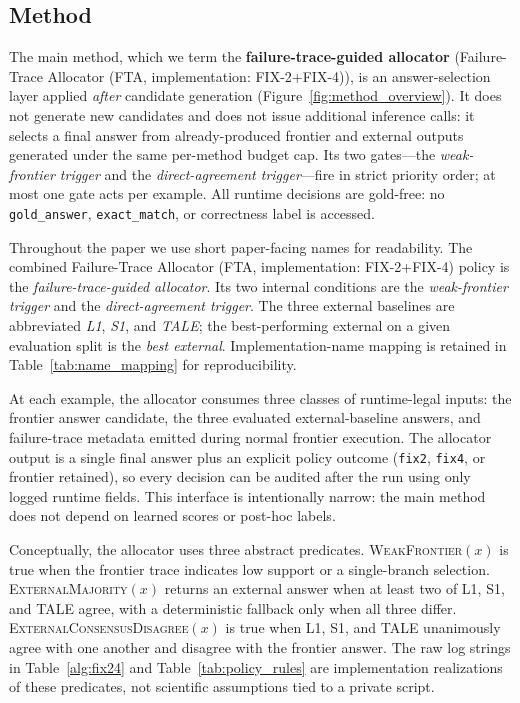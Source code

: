 \subsection{Method}
\label{sec:method}

The main method, which we term the \textbf{failure-trace-guided allocator} (Failure-Trace Allocator (FTA, implementation: FIX-2+FIX-4)), is an answer-selection layer applied \emph{after} candidate generation (Figure~\ref{fig:method_overview}). It does not generate new candidates and does not issue additional inference calls: it selects a final answer from already-produced frontier and external outputs generated under the same per-method budget cap. Its two gates---the \textit{weak-frontier trigger} and the \textit{direct-agreement trigger}---fire in strict priority order; at most one gate acts per example. All runtime decisions are gold-free: no \texttt{gold\_answer}, \texttt{exact\_match}, or correctness label is accessed.

Throughout the paper we use short paper-facing names for readability.
The combined Failure-Trace Allocator (FTA, implementation: FIX-2+FIX-4) policy is the \emph{failure-trace-guided allocator}.
Its two internal conditions are the \emph{weak-frontier trigger} and the \emph{direct-agreement trigger}.
The three external baselines are abbreviated \emph{L1}, \emph{S1}, and \emph{TALE}; the best-performing external on a given evaluation split is the \emph{best external}.
Implementation-name mapping is retained in Table~\ref{tab:name_mapping} for reproducibility.

At each example, the allocator consumes three classes of runtime-legal inputs:
the frontier answer candidate, the three evaluated external-baseline answers, and
failure-trace metadata emitted during normal frontier execution.
The allocator output is a single final answer plus an explicit policy outcome
(\texttt{fix2}, \texttt{fix4}, or frontier retained), so every decision can be
audited after the run using only logged runtime fields.
This interface is intentionally narrow: the main method does not depend on
learned scores or post-hoc labels.

Conceptually, the allocator uses three abstract predicates.
\textsc{WeakFrontier}$(x)$ is true when the frontier trace indicates low support
or a single-branch selection.
\textsc{ExternalMajority}$(x)$ returns an external answer when at least two of
L1, S1, and TALE agree, with a deterministic fallback only when all three differ.
\textsc{ExternalConsensusDisagree}$(x)$ is true when L1, S1, and TALE unanimously
agree with one another and disagree with the frontier answer.
The raw log strings in Table~\ref{alg:fix24} and Table~\ref{tab:policy_rules}
are implementation realizations of these predicates, not scientific assumptions
tied to a private script.


